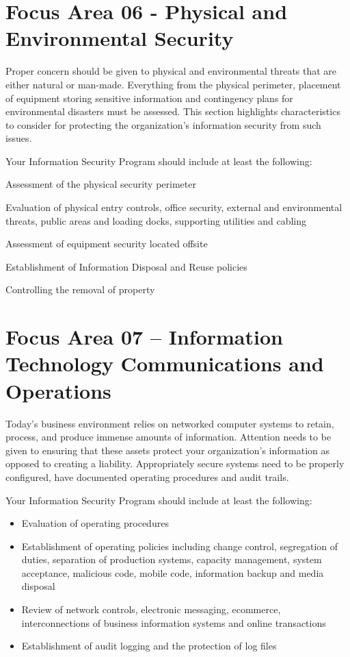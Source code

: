 \documentclass{needs}
\begin{document}
		\vspace{20pt}
		\fFiveTable	
		
	\section{Focus Area 06 - Physical and Environmental Security}
	
		Proper concern should be given to physical and environmental threats that are either natural or man-made.  Everything from the physical perimeter, placement of equipment storing sensitive information and contingency plans for environmental disasters must be assessed.  This section highlights characteristics to consider for protecting the organization’s information security from such issues.
		
		Your Information Security Program should include at least the following: 
		\begin{checklist}
			\item Assessment of the physical security perimeter
			\item Evaluation of physical entry controls, office security, external and environmental threats, public areas and loading docks, supporting utilities and cabling
			\item Assessment of equipment security located offsite
			\item Establishment of Information Disposal and Reuse policies
			\item Controlling the removal of property
		\end{checklist}
		
		\vspace{20pt}
		\fSixTable
		
	\section{Focus Area 07 – Information Technology Communications and Operations}
		
		Today’s business environment relies on networked computer systems to retain, process, and produce immense amounts of information.   Attention needs to be given to ensuring that these assets protect your organization’s information as opposed to creating a liability.  Appropriately secure systems need to be properly configured, have documented operating procedures and audit trails.  
		
		Your Information Security Program should include at least the following: 
		\begin{itemize}
			\item Evaluation of operating procedures
			\item Establishment of operating policies including change control, segregation of duties, separation of production systems, capacity management, system acceptance, malicious code, mobile code, information backup and media disposal
			\item Review of network controls, electronic messaging, ecommerce, interconnections of business information systems and online transactions
			\item Establishment of audit logging and the protection of log files
		\end{itemize}
		
\end{document}
